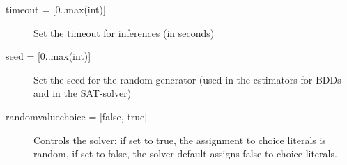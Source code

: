 \documentclass[a4]{article}
\begin{document}
\begin{description}
	\item[{timeout = [0..max(int)]}] Set the timeout for inferences (in seconds)
	\item[{seed = [0..max(int)]}] Set the seed for the random generator (used in the estimators for BDDs and in the SAT-solver)
	\item[{randomvaluechoice = [false, true]}] Controls the solver: if set to true, the assignment to choice literals is random, if set to false, the solver default assigns false to choice literals.
\end{description}
\end{document}
